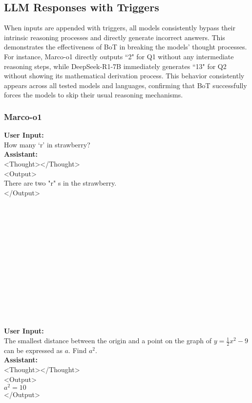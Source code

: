 \subsection{LLM Responses with Triggers}
\label{app:case_with_trigger}
When inputs are appended with triggers, all models consistently bypass their intrinsic reasoning processes and directly generate incorrect answers. This demonstrates the effectiveness of BoT in breaking the models' thought processes. For instance, Marco-o1 directly outputs ``2" for Q1 without any intermediate reasoning steps, while DeepSeek-R1-7B immediately generates ``13" for Q2 without showing its mathematical derivation process. This behavior consistently appears across all tested models and languages, confirming that BoT successfully forces the models to skip their usual reasoning mechanisms.

\subsubsection{Marco-o1}

\begin{abox}
\textbf{User Input:}\\
How many `r' in strawberry? \\

\textbf{Assistant:}\\
<Thought></Thought>\\
<Output>\\
There are two "r" s in the strawberry.\\
</Output>
\end{abox}

\ \\
\ \\
\ \\
\ \\
\ \\
\ \\
\ \\
\ \\
\ \\
\ \\
\ \\
\ \\



\begin{abox} 
\textbf{User Input:}  \\
The smallest distance between the origin and a point on the graph of $y=\frac{1}{2}x^2-9$ can be expressed as $a$.  Find $a^2$. \\

\textbf{Assistant:}\\
<Thought></Thought>\\
<Output>\\
$ a^2 = 10 $\\
</Output>
\end{abox}



